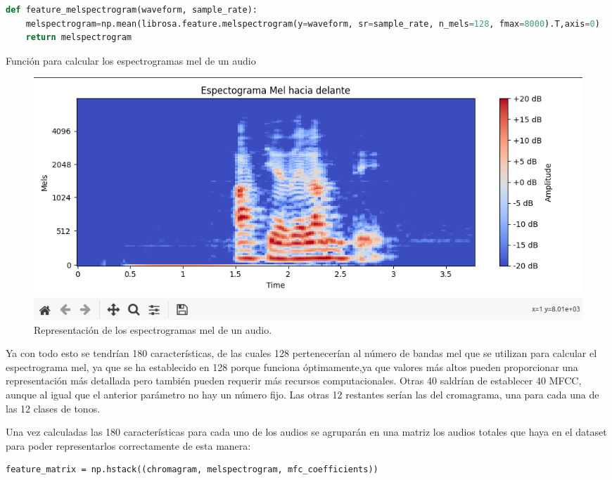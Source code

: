 \begin{code}[H]
\begin{lstlisting}[language=Python]
def feature_melspectrogram(waveform, sample_rate):
    melspectrogram=np.mean(librosa.feature.melspectrogram(y=waveform, sr=sample_rate, n_mels=128, fmax=8000).T,axis=0)
    return melspectrogram
\end{lstlisting}
\caption[Función para calcular los espectrogramas mel de un audio]{Función para calcular los espectrogramas mel de un audio}
\label{cod:codejemplo5}
\end{code}

\begin{figure}[H]
  \centering
  \includegraphics[scale=0.4]{figs/mel_spectrogram} %
  \caption{ Representación de los espectrogramas mel de un audio.}
  \label{fig:mel}
\end{figure}

Ya con todo esto se tendrían 180 características, de las cuales 128 pertenecerían al número de bandas mel que se utilizan para calcular el espectrograma mel, ya que se ha establecido en 128 porque funciona óptimamente,ya que valores más altos pueden proporcionar una representación más detallada pero también pueden requerir más recursos computacionales. Otras 40 saldrían de establecer 40 MFCC, aunque al igual que el anterior parámetro no hay un número fijo. Las otras 12 restantes serían las del cromagrama, una para cada una de las 12 clases de tonos.

Una vez calculadas las 180 características para cada uno de los audios se agruparán en una matriz los audios totales que haya en el dataset para poder representarlos correctamente de esta manera:

\begin{verbatim}
feature_matrix = np.hstack((chromagram, melspectrogram, mfc_coefficients))
\end{verbatim}

